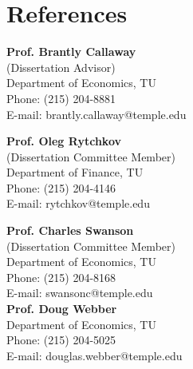 \documentclass[letterpaper]{article}
\begin{document}
\section*{References}
\vspace{-.15in}
\begin{multicols}{2}
	
	\textbf{Prof. Brantly Callaway} \\
	(Dissertation Advisor)\\
	Department of Economics, TU \\
	\hfill {Phone: (215) 204-8881}\\
	\hfill{E-mail: {\color{blue}brantly.callaway@temple.edu}}
	
	
	\textbf{Prof. Oleg Rytchkov}\\
	(Dissertation Committee Member)\\
	Department of Finance, TU\\
	\hfill Phone: (215) 204-4146\\
	\hfill{E-mail: {\color{blue}rytchkov@temple.edu}}\\
		\vspace{.8in}

		\columnbreak
	\textbf{Prof. Charles Swanson} \\
		(Dissertation Committee Member)\\
	Department of Economics, TU \\
	\hfill {Phone: (215) 204-8168}\\
	\hfill{E-mail: {\color{blue}swansonc@temple.edu}}\\

	\textbf{Prof. Doug Webber} \\
	Department of Economics, TU \\
	\hfill{Phone: (215) 204-5025} \\
	\hfill{E-mail: {\color{blue}douglas.webber@temple.edu}}\\
	
%	
\end{multicols}
\end{document}
